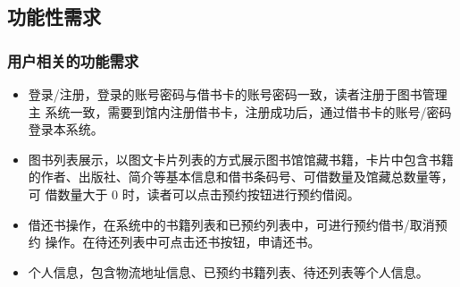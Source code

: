 \subsection{功能性需求}
\subsubsection{用户相关的功能需求}
\begin{itemize}
    \item 登录/注册，登录的账号密码与借书卡的账号密码一致，读者注册于图书管理主 系统一致，需要到馆内注册借书卡，注册成功后，通过借书卡的账号/密码登录本系统。
    \item 图书列表展示，以图文卡片列表的方式展示图书馆馆藏书籍，卡片中包含书籍 的作者、出版社、简介等基本信息和借书条码号、可借数量及馆藏总数量等，可 借数量大于 0 时，读者可以点击预约按钮进行预约借阅。
    \item 借还书操作，在系统中的书籍列表和已预约列表中，可进行预约借书/取消预约 操作。在待还列表中可点击还书按钮，申请还书。
    \item 个人信息，包含物流地址信息、已预约书籍列表、待还列表等个人信息。
\end{itemize}
